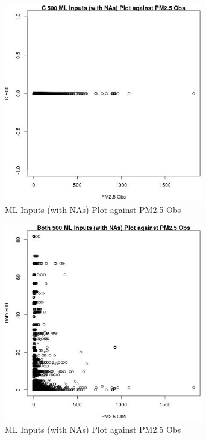 \begin{figure} 
\centering  
\includegraphics[width=0.77\textwidth]{Code_Outputs/Report_ML_input_PM25_Step4_part_e_de_duplicated_aveswNAs_C_500vPM25_Obs.jpg} 
\caption{\label{fig:Report_ML_input_PM25_Step4_part_e_de_duplicated_aveswNAsC_500vPM25_Obs}ML Inputs (with NAs) Plot against PM2.5 Obs} 
\end{figure} 
 

\begin{figure} 
\centering  
\includegraphics[width=0.77\textwidth]{Code_Outputs/Report_ML_input_PM25_Step4_part_e_de_duplicated_aveswNAs_Both_500vPM25_Obs.jpg} 
\caption{\label{fig:Report_ML_input_PM25_Step4_part_e_de_duplicated_aveswNAsBoth_500vPM25_Obs}ML Inputs (with NAs) Plot against PM2.5 Obs} 
\end{figure} 
 

